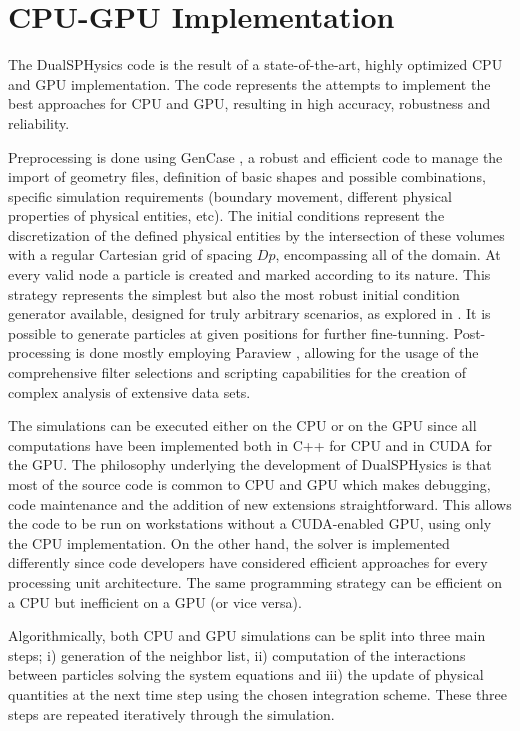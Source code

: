 \section{\ac{CPU}-\ac{GPU} Implementation}
\label{sec:CPU-GPU_Model}

The DualSPHysics code is the result of a state-of-the-art, highly optimized \ac{CPU} and \ac{GPU} implementation. The code represents the attempts to implement the best approaches for \ac{CPU} and \ac{GPU}, resulting in high accuracy, robustness and reliability. 

Preprocessing is done using GenCase \citep{Dominguez-2011b}, a robust and efficient code to manage the import of geometry files, definition of basic shapes and possible combinations, specific simulation requirements (boundary movement, different physical properties of physical entities, etc). The initial conditions represent the discretization of the defined physical entities by the intersection of these volumes with a regular Cartesian grid of spacing $Dp$, encompassing all of the domain. At every valid node a particle is created and marked according to its nature. This strategy represents the simplest but also the most robust initial condition generator available, designed for truly arbitrary scenarios, as explored in \cite{Crespo-2015}. It is possible to generate particles at given positions for further fine-tunning. Post-processing is done mostly employing Paraview \citep{Ayachit-2015}, allowing for the usage of the comprehensive filter selections and scripting capabilities for the creation of complex analysis of extensive data sets.

The simulations can be executed either on the \ac{CPU} or on the \ac{GPU} since all computations have been implemented both in C++ for \ac{CPU} and in \ac{CUDA} for the \ac{GPU}. The philosophy underlying the development of DualSPHysics is that most of the source code is common to \ac{CPU} and \ac{GPU} which makes debugging, code maintenance and the addition of new extensions straightforward. This allows the code to be run on workstations without a \ac{CUDA}-enabled \ac{GPU}, using only the \ac{CPU} implementation. On the other hand, the solver is implemented differently since code developers have considered efficient approaches for every processing unit architecture. The same programming strategy can be efficient on a \ac{CPU} but inefficient on a \ac{GPU} (or vice versa).

Algorithmically, both \ac{CPU} and \ac{GPU} simulations can be split into three main steps; i) generation of the neighbor list, ii) computation of the interactions between particles solving the system equations and iii) the update of physical quantities at the next time step using the chosen integration scheme. These three steps are repeated iteratively through the simulation.

